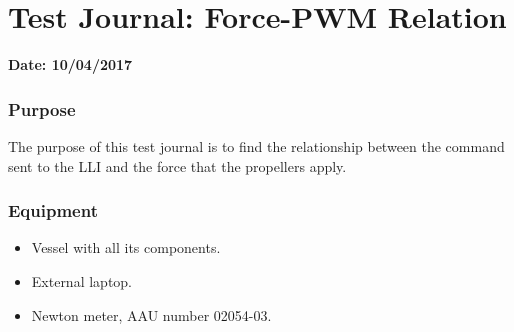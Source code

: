\chapter{Test Journal: Force-PWM Relation}\label{app:forceTest}

\textbf{Date: 10/04/2017}

\subsection*{Purpose}
The purpose of this test journal is to find the relationship between the command sent to the LLI and the force that the propellers apply.


\subsection*{Equipment}
\begin{itemize}
	\item Vessel with all its components.
	\item External laptop.
    \item Newton meter, AAU number 02054-03.
\end{itemize}

